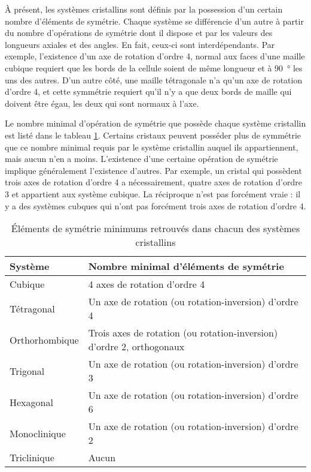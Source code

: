 À présent, les systèmes cristallins sont définis par la possession d'un certain
nombre d'éléments de symétrie. Chaque système se différencie d'un autre à partir
du nombre d'opérations de symétrie dont il dispose et par les valeurs des
longueurs axiales et des angles. En fait, ceux-ci sont interdépendants. Par
exemple, l'existence d'un axe de rotation d'ordre 4, normal aux faces d'une
maille cubique requiert que les bords de la cellule soient de même longueur et à
\SI{90}{\degree} les uns des autres. D'un autre côté, une maille tétragonale n'a
qu'un axe de rotation d'ordre 4, et cette symmétrie requiert qu'il n'y a que deux
bords de maille qui doivent être égau, \ie les deux qui sont normaux à l'axe.

Le nombre minimal d'opération de symétrie que possède chaque système cristallin
est listé dans le tableau \ref{tab:minsym}. Certains cristaux peuvent posséder
plus de symmétrie que ce nombre minimal requis par le système cristallin auquel
ils appartiennent, mais aucun n'en a moins. L'existence d'une certaine opération
de symétrie implique généralement l'existence d'autres. Par exemple, un cristal
qui possèdent trois axes de rotation d'ordre 4 a nécessairement, quatre axes de
rotation d'ordre 3 et appartient aux système cubique. La réciproque n'est pas
forcément vraie : il y a des systèmes cubques qui n'ont pas forcément trois axes
de rotation d'ordre 4.

\begin{table}
    \begin{tabularx}{\textwidth}{lX}
        \toprule
        Système & Nombre minimal d'éléments de symétrie \\
        \midrule
        Cubique & 4 axes de rotation d'ordre 4 \\
        Tétragonal & Un axe de rotation (ou rotation-inversion) d'ordre 4\\
        Orthorhombique & Trois axes de rotation (ou rotation-inversion) d'ordre
        2, orthogonaux \\
        Trigonal & Un axe de rotation (ou rotation-inversion) d'ordre 3 \\
        Hexagonal & Un axe de rotation (ou rotation-inversion) d'ordre 6 \\
        Monoclinique & Un axe de rotation (ou rotation-inversion) d'ordre 2 \\
        Triclinique & Aucun\\
        \bottomrule
    \end{tabularx}
    \label{tab:minsym}
    \caption{Éléments de symétrie minimums retrouvés dans chacun des systèmes
    cristallins}
\end{table}

